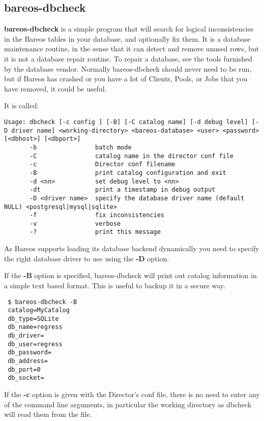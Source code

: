 \subsection{bareos-dbcheck}
    \label{bareos-dbcheck}
    \label{dbcheck}


{\bf bareos-dbcheck} is a simple program that will search for logical
inconsistencies in the Bareos tables in your database, and optionally fix them.
It is a database maintenance routine, in the sense that it can
detect and remove unused rows, but it is not a database repair
routine. To repair a database, see the tools furnished by the
database vendor.  Normally bareos-dbcheck should never need to be run,
but if Bareos has crashed or you have a lot of Clients, Pools, or
Jobs that you have removed, it could be useful.

It is called:

\footnotesize
\begin{verbatim}
Usage: dbcheck [-c config ] [-B] [-C catalog name] [-d debug level] [-D driver name] <working-directory> <bareos-database> <user> <password> [<dbhost>] [<dbport>]
       -b                batch mode
       -C                catalog name in the director conf file
       -c                Director conf filename
       -B                print catalog configuration and exit
       -d <nn>           set debug level to <nn>
       -dt               print a timestamp in debug output
       -D <driver name>  specify the database driver name (default NULL) <postgresql|mysql|sqlite>
       -f                fix inconsistencies
       -v                verbose
       -?                print this message
\end{verbatim}
\normalsize

As Bareos supports loading its database backend dynamically you need to specify
the right database driver to use using the {\bf -D} option.

If the \textbf{-B} option is specified, bareos-dbcheck will print out catalog
information in a simple text based format. This is useful to backup it in a
secure way.

\begin{verbatim}
 $ bareos-dbcheck -B
 catalog=MyCatalog
 db_type=SQLite
 db_name=regress
 db_driver=
 db_user=regress
 db_password=
 db_address=
 db_port=0
 db_socket=
\end{verbatim} %

If the {\bf -c} option is given with the Director's conf file, there is no
need to enter any of the command line arguments, in particular the working
directory as dbcheck will read them from the file.

